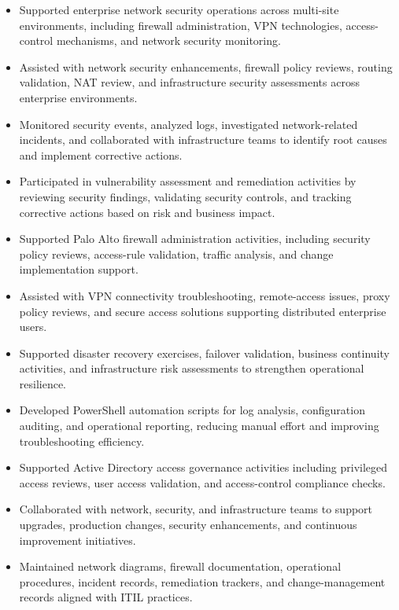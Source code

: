 \documentclass[11pt,a4paper]{article}
\begin{document}
\begin{itemize}[leftmargin=*]
\item Supported enterprise network security operations across multi-site environments, including firewall administration, VPN technologies, access-control mechanisms, and network security monitoring.

\item Assisted with network security enhancements, firewall policy reviews, routing validation, NAT review, and infrastructure security assessments across enterprise environments.

\item Monitored security events, analyzed logs, investigated network-related incidents, and collaborated with infrastructure teams to identify root causes and implement corrective actions.

\item Participated in vulnerability assessment and remediation activities by reviewing security findings, validating security controls, and tracking corrective actions based on risk and business impact.

\item Supported Palo Alto firewall administration activities, including security policy reviews, access-rule validation, traffic analysis, and change implementation support.

\item Assisted with VPN connectivity troubleshooting, remote-access issues, proxy policy reviews, and secure access solutions supporting distributed enterprise users.

\item Supported disaster recovery exercises, failover validation, business continuity activities, and infrastructure risk assessments to strengthen operational resilience.

\item Developed PowerShell automation scripts for log analysis, configuration auditing, and operational reporting, reducing manual effort and improving troubleshooting efficiency.

\item Supported Active Directory access governance activities including privileged access reviews, user access validation, and access-control compliance checks.

\item Collaborated with network, security, and infrastructure teams to support upgrades, production changes, security enhancements, and continuous improvement initiatives.

\item Maintained network diagrams, firewall documentation, operational procedures, incident records, remediation trackers, and change-management records aligned with ITIL practices.
\end{itemize}
\end{document}

